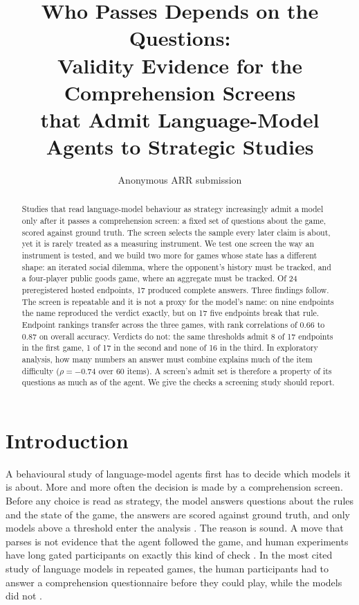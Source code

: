 \documentclass[11pt]{article}
\title{Who Passes Depends on the Questions:\\
       Validity Evidence for the Comprehension Screens\\
       that Admit Language-Model Agents to Strategic Studies}
\author{Anonymous ARR submission}
\begin{document}
\maketitle

\begin{abstract}
Studies that read language-model behaviour as strategy increasingly admit a
model only after it passes a comprehension screen: a fixed set of questions
about the game, scored against ground truth. The screen selects the sample
every later claim is about, yet it is rarely treated as a measuring
instrument. We test one screen the way an instrument is tested, and we build
two more for games whose state has a different shape: an iterated social
dilemma, where the opponent's history must be tracked, and a four-player public
goods game, where an aggregate must be tracked. Of 24 preregistered hosted
endpoints, 17 produced complete answers. Three findings follow.
The screen is repeatable and it is not a proxy for the model's name: on nine
endpoints the name reproduced the verdict exactly, but on 17 five endpoints
break that rule. Endpoint rankings transfer across the three games, with rank
correlations of 0.66 to 0.87 on overall accuracy. Verdicts do not: the same
thresholds admit 8 of 17 endpoints in the first game, 1 of 17 in the second
and none of 16 in the third. In exploratory analysis, how many numbers an
answer must combine explains much of the item difficulty ($\rho=-0.74$ over 60
items). A screen's admit set is therefore a property of its questions as much
as of the agent. We give the checks a screening study should report.
\end{abstract}

\section{Introduction}
\label{sec:intro}

A behavioural study of language-model agents first has to decide which models
it is about. More and more often the decision is made by a comprehension
screen. Before any choice is read as strategy, the model answers questions
about the rules and the state of the game, the answers are scored against
ground truth, and only models above a threshold enter the analysis
\citep{huang2026probing,cacioli2026screen}. The reason is sound. A move that
parses is not evidence that the agent followed the game, and human experiments
have long gated participants on exactly this kind of check
\citep{oppenheimer2009instructional,chou2009control}. In the most cited study
of language models in repeated games, the human participants had to answer a
comprehension questionnaire before they could play, while the models did not
\citep{akata2025playing}.
\end{document}
